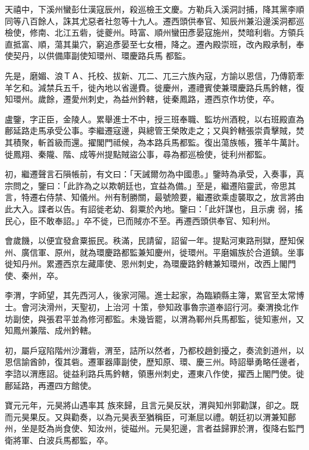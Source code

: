 \begin{pinyinscope}
 天禧中，下溪州蠻彭仕漢寇辰州，殺巡檢王文慶。方勒兵入溪洞討捕，降其黨李順同等八百餘人，誅其尤惡者社忽等十九人。遷西頭供奉官、知辰州兼沿邊溪洞都巡檢使，修南、北江五砦，徙夔州。時富、順州蠻田彥晏寇施州，焚暗利砦。方領兵直抵富、順，蕩其巢穴，窮追彥晏至七女柵，降之。遷內殿崇班，改內殿承制，奉使契丹，以供備庫副使知環州、環慶路兵馬
 都監。



 先是，磨媚、浪ＴＡ、托校、拔新、兀二、兀三六族內寇，方諭以恩信，乃傳箭牽羊乞和。減禁兵五千，徙內地以省邊費。徙慶州，遷禮賓使兼環慶路兵馬鈐轄，復知環州。歲餘，遷愛州刺史，為益州鈐轄，徙秦鳳路，遷西京作坊使，卒。



 盧鑒，字正臣，金陵人。累舉進士不中，授三班奉職、監坊州酒稅，以右班殿直為鄜延路走馬承受公事。李繼遷寇邊，與總管王榮敗走之；又與鈐轄張崇貴擊賊，焚
 其積聚，斬首級而還。擢閣門祗候，為本路兵馬都監。復出蕩族帳，獲羊牛萬計。徙鳳翔、秦隴、階、成等州提點賊盜公事，尋為都巡檢使，徙利州都監。



 初，繼遷聲言石隕帳前，有文曰：「天誡爾勿為中國患。」鑒時為承受，入奏事，真宗問之，鑒曰：「此詐為之以欺朝廷也，宜益為備。」至是，繼遷陷靈武，帝思其言，特遷右侍禁、知儀州。州有制勝關，最號險要，繼遷欲乘虛襲取之，放言將由此大入。諜者以告。有詔徙老幼、芻粟於內地。鑒曰：「此奸謀也，且示虜
 弱，搖民心，臣不敢奉詔。」卒不徙，已而賊亦不至。再遷西頭供奉官、知利州。



 會歲饑，以便宜發倉粟振民。秩滿，民請留，詔留一年。提點河東路刑獄，歷知保州、廣信軍、原州，就為環慶路都監兼知慶州，徙環州。平磨媚族於合道鎮。坐事徙知丹州。累遷西京左藏庫使、恩州刺史，為環慶路鈐轄兼知環州，改西上閣門使、秦州，卒。



 李渭，字師望，其先西河人，後家河陽。進士起家，為臨穎縣主簿，累官至太常博士。會河決滑州，天聖初，上治河
 十策，參知政事魯宗道奉詔行河。秦渭換北作坊副使，與張君平並為修河都監。未幾皆罷，以渭為鄆州兵馬都監，徙知憲州，又知鳳州兼階、成州鈐轄。



 初，屬戶寇陷階州沙灘砦，渭至，詰所以然者，乃都校趙釗擾之，奏流釗道州，以恩信諭酋帥，復其砦。遷軍器庫副使，歷知原、環、慶三州。時詔舉勇略任邊者，李諮以渭應詔。徙益利路兵馬鈐轄，領惠州刺史，遷東八作使，擢西上閣門使。徙鄜延路，再遷四方館使。



 寶元元年，元昊將山遇率其
 族來歸，且言元昊反狀，渭與知州郭勸謀，卻之。既而元昊果反。又與勸奏，以為元昊表至猶稱臣，可漸屈以禮。朝廷初以渭兼知鄜州，坐是貶為尚食使、知汝州，徙磁州。元昊犯邊，言者益歸罪於渭，復降右監門衛將軍、白波兵馬都監，卒。




\end{pinyinscope}
